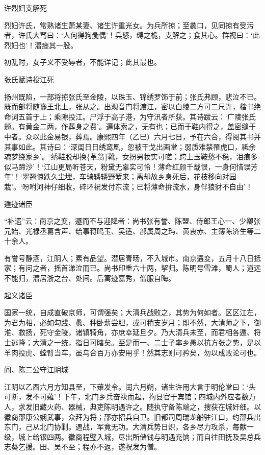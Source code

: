 \documentclass[]{article}
\begin{document}
许烈妇支解死

烈妇许氏，常熟诸生萧某妻、诸生许重光女。为兵所掠；至蠡口，见同掠有受污者，许氏大骂曰：`人何得狗彘偶'！兵怒，缚之桅，支解之；食其心。群视曰：`此烈妇也'！潜瘗其一股。

初乱时，女子义不受辱者，不能详记；此其最也。

张氏赋诗投江死

扬州既陷，一部将掠张氏至金陵，以珠玉、锦绣罗饰于前；张氏弗顾，悲泣不已。既而部将随豫王北上，张从之。出观音门将渡江，密以白绫二方可二尺许，楷书绝命词五首于上；乘隙投江。尸浮于高子港，为守汛者所获。其诗跋云：`广陵张氏题。有黄金二两，作葬身之费'。遍体索之，无有也；已而于鞋内得之，盖密缝于中者。众以此金易银，葬焉。康熙四年（乙巳）六月七日，予在六合，得阅其书并其事如此。其诗曰：`深闺日日绣鸾凰，忽被干戈出画堂；弱质难禁罹虎口，祗余魂梦绕家乡'。`绣鞋脱却换\{革翁\}靴，女扮男妆实可嗟；跨上玉鞍愁不稳，泪痕多似马蹄沙'！`江山更局听苍天，粉黛无辜实可怜！薄命红颜千载恨，一身何惜误芳年'！`翠翘惊跌久尘埋，车骑辚辚野堑来；离却故乡身死后，花枝移向对园栽'。`吩咐河神仔细收，碎环祝发付东流；已将薄命拚流水，身伴狼豺不自由'！

遁迹诸臣

``补遗''云：南京之变，遯而不与迎降者：尚书张有誉、陈盟、侍郎王心一、少卿张元始、光禄丞葛含声、给事蒋鸣玉、吴适、部属周之玙、黄衷赤、主簿陈济生等二十余人。

有誉号静涵，江阴人；素有品望。潜居青旸，不入城市。南京遘变，五月十八日抵家；有问之者，摇首涕泣而已。尚书印重六十两，挈归。陈明号雪滩，蜀人；道远不能归，潜居浙之台、处间。后寓迹嘉秀，僧服自晦。

起义诸臣

国家一统，自成直破京师，可谓强矣；大清兵战败之，其势为何如者。区区江左，为君为相，必如勾践、蠡、种卧薪尝胆，或可稍支岁月；即不然，大清师之下，御淮、救扬，死守金陵，诸镇犄角，亦庶幸延旦夕。乃大清兵未至，而君相各遁、将士逃降；大清之一统，指日可睹矣。至是而一、二士子率乡愚以抗方张之势，是以羊肉投虎、螳臂当车，虽乌合百万亦安用乎！然其志则可矜矣，勿以成败论可也。

阎、陈二公守江阴城

江阴以乙酉六月方知县至，下薙发令。闰六月朔，诸生许用大言于明伦堂曰：`头可断，发不可薙'！下午，北门乡兵奋袂而起，拘县官于宾馆；四城内外应者数万人，求发旧藏火药、器械，典吏陈明遇许之。随执守备陈端之，搜获在城奸细。以徽商邵康公娴武事，众拜为将；邵亦招兵自卫。旧都司周瑞龙船驻江口，约邵兵出东门，己从北门协剿。遇战，军竟无功。大清兵势日炽，各乡尽力攻杀，每献一级，城上给银四两。徽商程璧入城，尽出所储钱与明遇充饷；而自往田抚及吴总兵志葵乞援。田、吴不至；程亦不返，遂祝发为僧。
\end{document}
